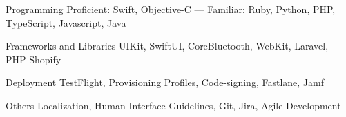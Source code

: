 

\begin{cvskills}

  \cvskill
    {Programming} %
    {Proficient: Swift, Objective-C --- Familiar: Ruby, Python, PHP, TypeScript, Javascript, Java} %

  \cvskill
    {Frameworks and Libraries} %
    {UIKit, SwiftUI, CoreBluetooth, WebKit, Laravel, PHP-Shopify} %
    
  \cvskill
    {Deployment} %
    {TestFlight, Provisioning Profiles, Code-signing, Fastlane, Jamf} %

  \cvskill
    {Others} %
    {Localization, Human Interface Guidelines, Git, Jira, Agile Development} %

\end{cvskills}